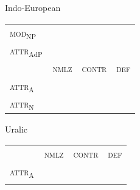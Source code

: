 {%

\begin{figure}
\parbox[b]{0.5\textwidth}{
\begin{center}Indo-European\\
\medskip
\begin{tabular}{| m{1.4cm} || m{.9cm} | m{1.1cm} | m{.7cm} |}
\cline{1-1}
\textsc{mod}$_{\text{NP}}$\\
\cline{1-1}
\textsc{attr}$_{\text{AdP}}$\\
\hline
 & \textsc{nmlz} & \textsc{contr} & \textsc{def}\\
\hline
\textsc{attr}$_{\text{A}}$\\
\cline{1-1}
\textsc{attr}$_{\text{N}}$\\
\cline{1-1}
\end{tabular}
\end{center}
}
\parbox[b]{0.5\textwidth}{
\begin{center}Uralic\\
\medskip
\begin{tabular}{| m{1.4cm} || m{.9cm} | m{1.1cm} | m{.7cm} |}
\cline{1-1}
\\
\cline{1-1}
\\
\hline
 & \textsc{nmlz} & \textsc{contr} & \textsc{def}\\
\hline
\textsc{attr}$_{\text{A}}$\\
\cline{1-1}
\\
\cline{1-1}
\end{tabular}
\end{center}
}


\end{figure}}

